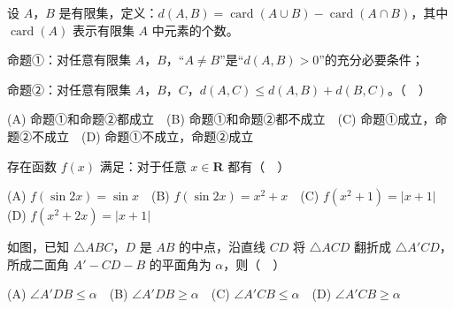 \begin{question}
设 \(A\)，\(B\) 是有限集，定义：\(d(A,B)=\operatorname{card}(A\cup B)-\operatorname{card}(A\cap B)\)，其中 \(\operatorname{card}(A)\) 表示有限集 \(A\) 中元素的个数。

命题①：对任意有限集 \(A\)，\(B\)，“\(A\neq B\)”是“\(d(A,B)>0\)”的充分必要条件；

命题②：对任意有限集 \(A\)，\(B\)，\(C\)，\(d(A,C)\leqslant d(A,B)+d(B,C)\)。（　）

(A) 命题①和命题②都成立　(B) 命题①和命题②都不成立　(C) 命题①成立，命题②不成立　(D) 命题①不成立，命题②成立

\end{question}
\begin{question}
存在函数 \(f(x)\) 满足：对于任意 \(x\in\mathbf{R}\) 都有（　）

(A) \(f(\sin 2x)=\sin x\)　(B) \(f(\sin 2x)=x^2+x\)　(C) \(f(x^2+1)=|x+1|\)　(D) \(f(x^2+2x)=|x+1|\)

\Needspace{0.4\textheight}
\end{question}
\begin{question}
如图，已知 \(\triangle ABC\)，\(D\) 是 \(AB\) 的中点，沿直线 \(CD\) 将 \(\triangle ACD\) 翻折成 \(\triangle A'CD\)，所成二面角 \(A'-CD-B\) 的平面角为 \(\alpha\)，则（　）
\nopagebreak[4]
\begin{center}\end{center}
\nopagebreak[4]
(A) \(\angle A'DB\leqslant\alpha\)　(B) \(\angle A'DB\geqslant\alpha\)　(C) \(\angle A'CB\leqslant\alpha\)　(D) \(\angle A'CB\geqslant\alpha\)

\end{question}

